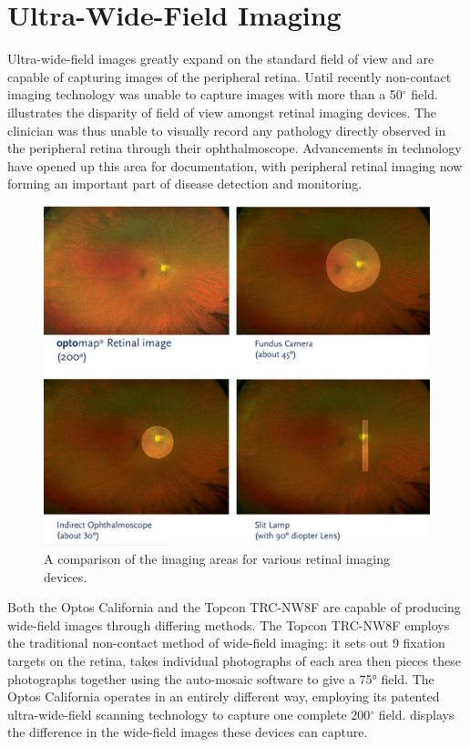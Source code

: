 \section{Ultra-Wide-Field Imaging}

Ultra-wide-field images greatly expand on the standard field of view and are capable of capturing images of the peripheral retina. Until recently non-contact imaging technology was unable to capture images with more than a 50$^\circ$ field.  illustrates the disparity of field of view amongst retinal imaging devices. The clinician was thus unable to visually record any pathology directly observed in the peripheral retina through their ophthalmoscope. Advancements in technology have opened up this area for documentation, with peripheral retinal imaging now forming an important part of disease detection and monitoring.

\begin{figure}[htbp]
\centering
 \includegraphics{figures/uwfcomparison}
\caption{A comparison of the imaging areas for various retinal imaging devices.}
\label{fig:uwfc}
    \end{figure}

Both the Optos California and the Topcon TRC-NW8F are capable of producing wide-field images through differing methods. The Topcon TRC-NW8F employs the traditional non-contact method of wide-field imaging: it sets out 9 fixation targets on the retina, takes individual photographs of each area then pieces these photographs together using the auto-mosaic software to give a 75° field. The Optos California operates in an entirely different way, employing its patented ultra-wide-field scanning technology to capture one complete 200$^\circ$ field.  displays the difference in the wide-field images these devices can capture.

